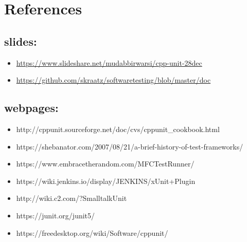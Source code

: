 \documentclass[10pt,a4paper,onecolumn,notitlepage]{article}
\begin{document}
\section*{References}
\subsection*{slides:}
\begin{itemize}
\item \hyperref[https://www.slideshare.net/mudabbirwarsi/cpp-unit-28dec]{https://www.slideshare.net/mudabbirwarsi/cpp-unit-28dec}
\item \hyperref[https://github.com/skraatz/softwaretesting/blob/master/doc/]{https://github.com/skraatz/softwaretesting/blob/master/doc}
\end{itemize}
\subsection*{webpages:}
\begin{itemize}
\item http://cppunit.sourceforge.net/doc/cvs/cppunit\_cookbook.html
\item https://shebanator.com/2007/08/21/a-brief-history-of-test-frameworks/
\item https://www.embracetherandom.com/MFCTestRunner/
\item https://wiki.jenkins.io/display/JENKINS/xUnit+Plugin
\item http://wiki.c2.com/?SmalltalkUnit
\item https://junit.org/junit5/
\item https://freedesktop.org/wiki/Software/cppunit/
\end{itemize}
\end{document}
